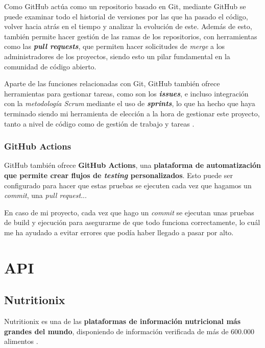 
Como GitHub actúa como un repositorio basado en Git, mediante GitHub se puede examinar todo el historial de versiones por las que ha pasado el código, volver hacia atrás en el tiempo y analizar la evolución de este. Además de esto, también permite hacer gestión de las ramas de los repositorios, con herramientas como las \textit{\textbf{pull requests}}, que permiten hacer solicitudes de \textit{merge} a los administradores de los proyectos, siendo esto un pilar fundamental en la comunidad de código abierto.

Aparte de las funciones relacionadas con Git, GitHub también ofrece herramientas para gestionar tareas, como son los \textit{\textbf{issues}}, e incluso integración con la \textit{metodología Scrum} mediante el uso de \textit{\textbf{sprints}}, lo que ha hecho que haya terminado siendo mi herramienta de elección a la hora de gestionar este proyecto, tanto a nivel de código como de gestión de trabajo y tareas \cite{wikipedia:github}.

\subsubsection{GitHub Actions}

GitHub también ofrece \textbf{GitHub Actions}, una \textbf{plataforma de automatización que permite crear flujos de \textit{testing} personalizados}. Esto puede ser configurado para hacer que estas pruebas se ejecuten cada vez que hagamos un \textit{commit}, una \textit{pull request}... \cite{github-actions:docs}

En caso de mi proyecto, cada vez que hago un \textit{commit} se ejecutan unas pruebas de build y ejecución para asegurarme de que todo funciona correctamente, lo cuál me ha ayudado a evitar errores que podía haber llegado a pasar por alto.


\section{API}

\subsection{Nutritionix}

Nutritionix es una de las \textbf{plataformas de información nutricional más grandes del mundo}, disponiendo de información verificada de más de 600.000 alimentos \cite{nutritionix:main}.

